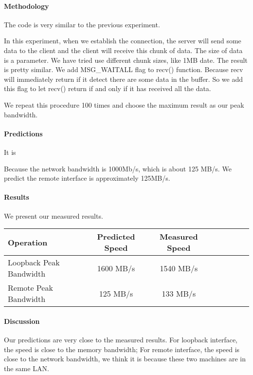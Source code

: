 \paragraph{Methodology}
The code is very similar to the previous experiment.

In this experiment, when we establish the connection, the server will send some data to the client and the client will receive this chunk of data. The size of data is a parameter. We have tried use different chunk sizes,  like 1MB date. The result is pretty similar. We add MSG\_WAITALL flag to recv() function. Because recv will immediately return if it detect there are some data in the buffer. So we add this flag to let recv() return if and only if it has received all the data.

We repeat this procedure 100 times and choose the maximum result as our peak bandwidth.

\paragraph{Predictions}
It is 

Because the network bandwidth is 1000Mb/s, which is about 125 MB/s. We predict the remote interface is approximately 125MB/s.

\paragraph{Results}
We present our measured results.

\begin{center}
\begin{tabular}{l*{6}{c}r}
Operation       &  Predicted Speed& Measured Speed\\
\hline
Loopback Peak Bandwidth & 1600 MB/s & 1540 MB/s \\
Remote Peak Bandwidth & 125 MB/s  & 133 MB/s\\
\end{tabular}
\end{center}


\paragraph{Discussion}
Our predictions are very close to the measured results. For loopback interface, the speed is close to the memory bandwidth; For remote interface, the speed is close to the network bandwidth, we think it is because these two machines are in the same LAN.


